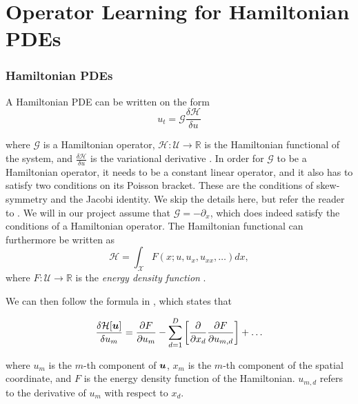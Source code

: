 \chapter{Operator Learning for Hamiltonian PDEs} \label{sec:HINO_theory}

\subsection{Hamiltonian PDEs}

A Hamiltonian PDE can be written on the form 
\begin{equation}
    u_t = \mathcal{G} \frac{\delta \mathcal{H}}{\delta u}
    \label{eq:hamiltonian_pde}
\end{equation}

where \(\mathcal{G}\) is a Hamiltonian operator, \(\mathcal{H} : \mathcal{U} \to \mathbb{R}\) is the Hamiltonian functional of the system, and \(\frac{\delta \mathcal{H}}{\delta u}\) is the variational derivative \cite{leimkuhlerSimulatingHamiltonianDynamics2005, olverApplicationsLieGroups1986}.
In order for \(\mathcal{G}\) to be a Hamiltonian operator, it needs to be a constant linear operator, and it also has to satisfy two conditions on its Poisson bracket. These are the conditions of skew-symmetry and the Jacobi identity. We skip the details here, but refer the reader to \cite{olverApplicationsLieGroups1986}.
We will in our project assume that \(\mathcal{G}=-\partial_x\), which does indeed satisfy the conditions of a Hamiltonian operator.
The Hamiltonian functional can furthermore be written as \[\mathcal{H} = \int_{\mathcal{X}} F(x; u, u_x, u_{xx}, \ldots) dx,\] where \(F : \mathcal{U} \to \mathbb{R}\) is the \textit{energy density function} \cite{olverApplicationsLieGroups1986,tanakaNeuralOperatorsMeet2024,celledoniPreservingEnergyResp2012}.

We can then follow the formula in , which states that 

\begin{equation}
    \frac{\delta \mathcal{H}[\bm{u}]}{\delta u_m} = \frac{\partial F}{\partial u_m}  - \sum_{d=1}^{D}\left[ \frac{\partial}{\partial x_d} \frac{\partial F}{\partial u_{m,d}} \right] + \ldots
    \label{eq:variational_derivative}
\end{equation}

where \(u_m\) is the \(m\)-th component of \(\bm{u}\), \(x_m\) is the \(m\)-th component of the spatial coordinate, and \(F\) is the energy density function of the Hamiltonian. \(u_{m,d}\) refers to the derivative of \(u_m\) with respect to \(x_d\).

